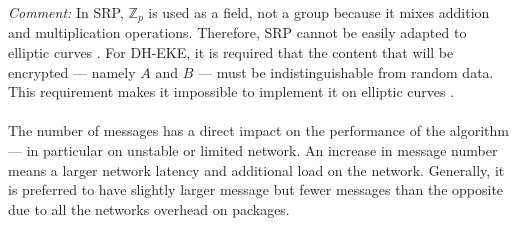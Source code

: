 ﻿\documentclass[../report.tex]{subfiles}
\begin{document}
\emph{Comment:} In SRP, $\mathbb{Z}_p$ is used as a field, not a group because it mixes addition and multiplication operations. Therefore, SRP cannot be easily adapted to elliptic curves \cite{CAA}. %
For DH-EKE, it is required that the content that will be encrypted --- namely $A$ and $B$ --- must be indistinguishable from random data. 
This requirement makes it impossible to implement it on elliptic curves \cite{EKE_ECC}. %


\paragraph{}
The number of messages has a direct impact on the performance of the algorithm --- in particular on unstable or limited network. An increase in message number means a larger network latency and additional load on the network. Generally, it is preferred to have slightly larger message but fewer messages than the opposite due to all the networks overhead on packages.
\end{document}
